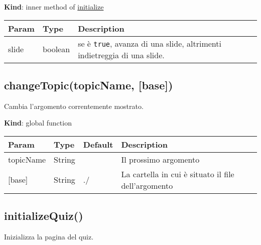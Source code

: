 \textbf{Kind}: inner method of
\protect\hyperlink{initialize}{initialize}

\begin{longtable}[]{@{}lll@{}}
\toprule
\begin{minipage}[b]{0.30\columnwidth}\raggedright
Param\strut
\end{minipage} & \begin{minipage}[b]{0.30\columnwidth}\raggedright
Type\strut
\end{minipage} & \begin{minipage}[b]{0.30\columnwidth}\raggedright
Description\strut
\end{minipage}\tabularnewline
\midrule
\endhead
\begin{minipage}[t]{0.30\columnwidth}\raggedright
slide\strut
\end{minipage} & \begin{minipage}[t]{0.30\columnwidth}\raggedright
boolean\strut
\end{minipage} & \begin{minipage}[t]{0.30\columnwidth}\raggedright
se è \texttt{true}, avanza di una slide, altrimenti indietreggia di una
slide.\strut
\end{minipage}\tabularnewline
\bottomrule
\end{longtable}

\hypertarget{changetopictopicname-base}{%
\subsection{changeTopic(topicName,
{[}base{]})}\label{changetopictopicname-base}}

Cambia l'argomento correntemente mostrato.

\textbf{Kind}: global function

\begin{longtable}[]{@{}llll@{}}
\toprule
Param & Type & Default & Description\tabularnewline
\midrule
\endhead
topicName & String & & Il prossimo argomento\tabularnewline
{[}base{]} & String & ./ & La cartella in cui è situato il file
dell'argomento\tabularnewline
\bottomrule
\end{longtable}

\hypertarget{initializequiz}{%
\subsection{initializeQuiz()}\label{initializequiz}}

Inizializza la pagina del quiz.


